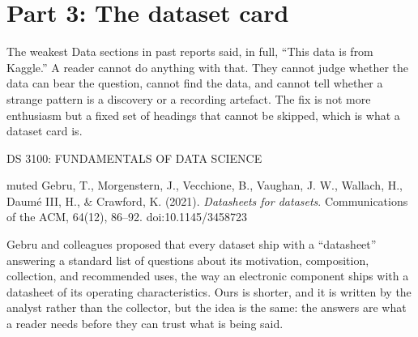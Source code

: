 \documentclass[11pt,letterpaper]{article}
\newcommand{\coursehead}{%
  {\sffamily\fontsize{7.5}{9}\selectfont\MakeUppercase{DS 3100: FUNDAMENTALS OF DATA SCIENCE}}%
}
\begin{document}
\section{Part 3: The dataset card}

The weakest Data sections in past reports said, in full, “This data is from Kaggle.” A reader cannot do anything with that. They cannot judge whether the data can bear the question, cannot find the data, and cannot tell whether a strange pattern is a discovery or a recording artefact. The fix is not more enthusiasm but a fixed set of headings that cannot be skipped, which is what a dataset card is.

\clearpage

\coursehead
\begin{callout}[title={\sffamily\fontsize{7.5}{9}\selectfont\color{muted}READING}]{muted}
Gebru, T., Morgenstern, J., Vecchione, B., Vaughan, J. W., Wallach, H., Daumé III, H., \& Crawford, K. (2021). \emph{Datasheets for datasets}. Communications of the ACM, 64(12), 86--92. doi:10.1145/3458723
\end{callout}

Gebru and colleagues proposed that every dataset ship with a “datasheet” answering a standard list of questions about its motivation, composition, collection, and recommended uses, the way an electronic component ships with a datasheet of its operating characteristics. Ours is shorter, and it is written by the analyst rather than the collector, but the idea is the same: the answers are what a reader needs before they can trust what is being said.
\end{document}
